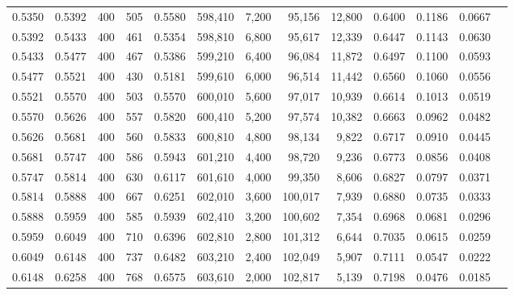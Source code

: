 \begin{tabular}{rrrrrrrrrrrrr}
0.5350 & 0.5392 &    400 &   505 &                                     0.5580 & 598,410 &   7,200 &  95,156 &  12,800 & 0.6400 & 0.1186 & 0.0667 \\
0.5392 & 0.5433 &    400 &   461 &                                     0.5354 & 598,810 &   6,800 &  95,617 &  12,339 & 0.6447 & 0.1143 & 0.0630 \\
0.5433 & 0.5477 &    400 &   467 &                                     0.5386 & 599,210 &   6,400 &  96,084 &  11,872 & 0.6497 & 0.1100 & 0.0593 \\
0.5477 & 0.5521 &    400 &   430 &                                     0.5181 & 599,610 &   6,000 &  96,514 &  11,442 & 0.6560 & 0.1060 & 0.0556 \\
0.5521 & 0.5570 &    400 &   503 &                                     0.5570 & 600,010 &   5,600 &  97,017 &  10,939 & 0.6614 & 0.1013 & 0.0519 \\
0.5570 & 0.5626 &    400 &   557 &                                     0.5820 & 600,410 &   5,200 &  97,574 &  10,382 & 0.6663 & 0.0962 & 0.0482 \\
0.5626 & 0.5681 &    400 &   560 &                                     0.5833 & 600,810 &   4,800 &  98,134 &   9,822 & 0.6717 & 0.0910 & 0.0445 \\
0.5681 & 0.5747 &    400 &   586 &                                     0.5943 & 601,210 &   4,400 &  98,720 &   9,236 & 0.6773 & 0.0856 & 0.0408 \\
0.5747 & 0.5814 &    400 &   630 &                                     0.6117 & 601,610 &   4,000 &  99,350 &   8,606 & 0.6827 & 0.0797 & 0.0371 \\
0.5814 & 0.5888 &    400 &   667 &                                     0.6251 & 602,010 &   3,600 & 100,017 &   7,939 & 0.6880 & 0.0735 & 0.0333 \\
0.5888 & 0.5959 &    400 &   585 &                                     0.5939 & 602,410 &   3,200 & 100,602 &   7,354 & 0.6968 & 0.0681 & 0.0296 \\
0.5959 & 0.6049 &    400 &   710 &                                     0.6396 & 602,810 &   2,800 & 101,312 &   6,644 & 0.7035 & 0.0615 & 0.0259 \\
0.6049 & 0.6148 &    400 &   737 &                                     0.6482 & 603,210 &   2,400 & 102,049 &   5,907 & 0.7111 & 0.0547 & 0.0222 \\
0.6148 & 0.6258 &    400 &   768 &                                     0.6575 & 603,610 &   2,000 & 102,817 &   5,139 & 0.7198 & 0.0476 & 0.0185 \\

\end{tabular}

